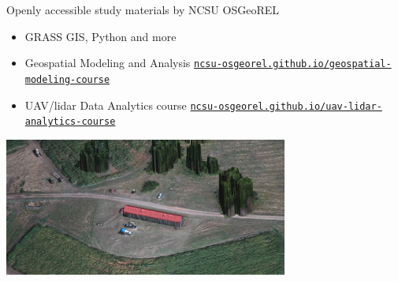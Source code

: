 \documentclass[xcolor={dvipsnames,usenames},beamer,aspectratio=169]{beamer}
\begin{document}
\begin{frame}{Openly accessible study materials by NCSU OSGeoREL}

\begin{itemize}
  \item GRASS GIS, Python and more
  \item Geospatial Modeling and Analysis
    {\tiny\href{http://ncsu-osgeorel.github.io/geospatial-modeling-course/}{\texttt{ncsu-osgeorel.github.io/geospatial-modeling-course}}}
  \item UAV/lidar Data Analytics course
    {\tiny\href{http://ncsu-osgeorel.github.io/uav-lidar-analytics-course/}{\texttt{ncsu-osgeorel.github.io/uav-lidar-analytics-course}}}
\end{itemize}

\centering
\includegraphics[width=0.7\textwidth]{agisoft_detail}%

\end{frame}
\end{document}
